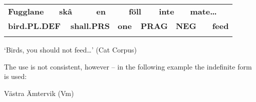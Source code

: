 \begin{tabular}{llllllllllll}
\lsptoprule
{\bfseries Fugglane} & \multicolumn{2}{l}{{\bfseries skâ}

} & \multicolumn{2}{l}{{\bfseries en}

} & \multicolumn{2}{l}{{\bfseries föll}

} & \multicolumn{2}{l}{{\bfseries inte}

} & \multicolumn{2}{l}{{\bfseries mate…}

} & \\
\multicolumn{2}{l}{{\bfseries bird.PL.DEF}

} & \multicolumn{2}{l}{{\bfseries shall.PRS}

} & \multicolumn{2}{l}{{\bfseries one}

} & \multicolumn{2}{l}{{\bfseries PRAG}

} & \multicolumn{2}{l}{{\bfseries NEG}

} & \multicolumn{2}{l}{{\bfseries feed}

}\\
\lspbottomrule
\end{tabular}

\begin{styleTranslation}
‘Birds, you should not feed…’ (Cat Corpus)

\end{styleTranslation}

The use is not consistent, however – in the following example the indefinite form is used:


\begin{listWWNumileveli}
\item {}

\end{listWWNumileveli}

\begin{listWWNumxixleveli}
\item {}

\begin{styleExLtrTbl}
Västra Ämtervik (Vm) 

\end{styleExLtrTbl}

\end{listWWNumxixleveli}

